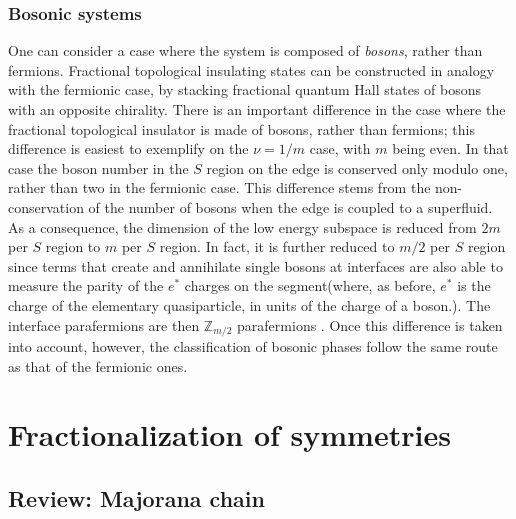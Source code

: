 \documentclass[twocolumn,aps,prb,showpacs]{revtex4-1}
\begin{document}
\subsubsection{Bosonic systems}\label{subs32}

One can consider a case where the system is composed of \emph{bosons}, rather than fermions. Fractional topological insulating states can be constructed in analogy with the fermionic case, by stacking fractional quantum Hall states of bosons with an opposite chirality. There is an important difference in the case where the fractional topological insulator is made of bosons, rather than fermions; this difference is easiest to exemplify on the $\nu=1/m$ case, with $m$ being even. In that case the boson number in the $S$ region on the edge is conserved only modulo one, rather than two in the fermionic case. This difference stems from the non-conservation of the number of bosons when the edge is coupled to a superfluid. As a consequence, the dimension of the low energy subspace is reduced from $2m$ per $S$ region to $m$ per $S$ region. In fact, it is further reduced to $m/2$ per $S$ region since terms that create and annihilate single bosons at interfaces are also able to measure the parity of the $e^*$ charges on the segment(where, as before, $e^*$ is the charge of the elementary quasiparticle, in units of the charge of a boson.). The interface parafermions are then $\mathbb{Z}_{m/2}$ parafermions \cite{Maghrebi2015}. Once this difference is taken into account, however, the classification of bosonic phases follow the same route as that of the fermionic ones.







\section{Fractionalization of symmetries} \label{fractionalization of symm}

\subsection{Review: Majorana chain}
\end{document}
